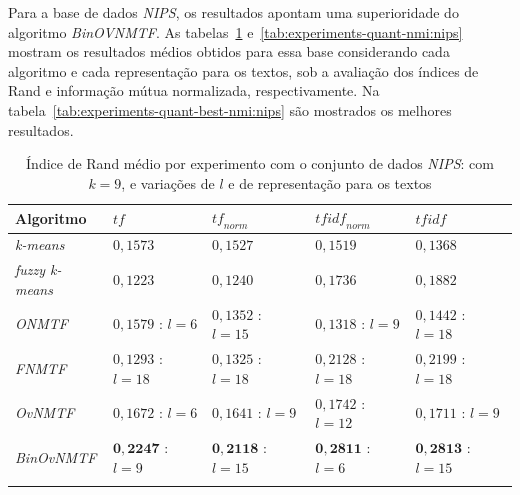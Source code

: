 \documentclass[
    12pt,                %
    oneside,            %
    a4paper,            %
    english,            %
    brazil                %
    ]{abntex2ppgsi}
\begin{document}

Para a base de dados \textit{NIPS}, os resultados apontam uma superioridade do algoritmo \textit{BinOVNMTF}. As tabelas~\ref{tab:experiments-quant-rand:nips} e~\ref{tab:experiments-quant-nmi:nips} mostram os resultados médios obtidos para essa base considerando cada algoritmo e cada representação para os textos, sob a avaliação dos índices de Rand e informação mútua normalizada, respectivamente. Na tabela~\ref{tab:experiments-quant-best-nmi:nips} são mostrados os melhores resultados.

\begin{table}[H]
\centering
    \caption{Índice de Rand médio por experimento com o conjunto de dados \textit{NIPS}: com $k = 9$, e variações de $l$ e de representação para os textos}
    \begin{tabular}{lllll}
        \hline
        \textbf{Algoritmo}              & $\textit{tf}$ & $\textit{tf}_{norm}$ & $\textit{tfidf}_{norm}$ & $\textit{tfidf}$ \\
        \hline
        \textit{k-means}       & $0,1573$            & $0,1527$            & $0,1519$            & $0,1368$ \\
        \textit{fuzzy k-means} & $0,1223$            & $0,1240$            & $0,1736$            & $0,1882$ \\
        \textit{ONMTF}         & $0,1579$ : $l = 6$  & $0,1352$ : $l = 15$ & $0,1318$ : $l = 9$  & $0,1442$ : $l = 18$ \\
        \textit{FNMTF}         & $0,1293$ : $l = 18$ & $0,1325$ : $l = 18$ & $0,2128$ : $l = 18$ & $0,2199$ : $l = 18$ \\
        \textit{OvNMTF}        & $0,1672$ : $l = 6$  & $0,1641$ : $l = 9$  & $0,1742$ : $l = 12$ & $0,1711$ : $l = 9$ \\
        \textit{BinOvNMTF}     & $\mathbf{0,2247}$ : $l = 9$ & $\mathbf{0,2118}$ : $l = 15$ & $\mathbf{0,2811}$ : $l = 6$ & $\mathbf{0,2813}$ : $l = 15$ \\
        \hline \\
    \end{tabular}
    \label{tab:experiments-quant-rand:nips}
\end{table}
\end{document}
